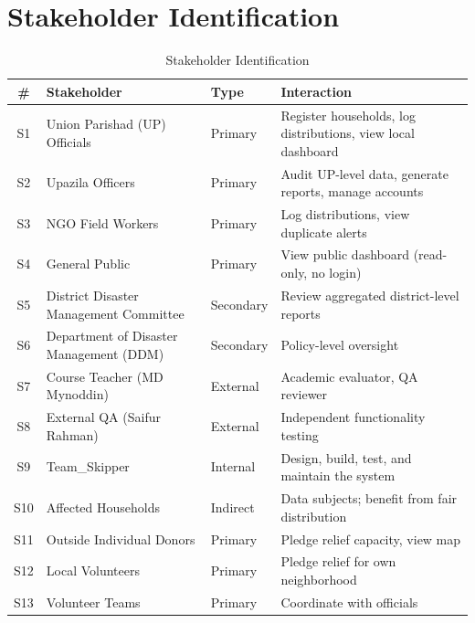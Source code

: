 
\section{Stakeholder Identification}
\vspace{-5pt}
\begin{table}[H]
\centering
\vspace{-8pt}
\caption{Stakeholder Identification}
\vspace{-8pt}
\label{tab:stakeholders}
\begin{tabularx}{\textwidth}{@{}cllX@{}}
\toprule
\# & Stakeholder & Type & Interaction \\
\midrule
S1 & Union Parishad (UP) Officials & Primary & Register households, log distributions, view local dashboard \\
S2 & Upazila Officers & Primary & Audit UP-level data, generate reports, manage accounts \\
S3 & NGO Field Workers & Primary & Log distributions, view duplicate alerts \\
S4 & General Public & Primary & View public dashboard (read-only, no login) \\
S5 & District Disaster Management Committee & Secondary & Review aggregated district-level reports \\
S6 & Department of Disaster Management (DDM) & Secondary & Policy-level oversight \\
S7 & Course Teacher (MD Mynoddin) & External & Academic evaluator, QA reviewer \\
S8 & External QA (Saifur Rahman) & External & Independent functionality testing \\
S9 & Team\_Skipper & Internal & Design, build, test, and maintain the system \\
S10 & Affected Households & Indirect & Data subjects; benefit from fair distribution \\
S11 & Outside Individual Donors & Primary & Pledge relief capacity, view map \\
S12 & Local Volunteers & Primary & Pledge relief for own neighborhood \\
S13 & Volunteer Teams & Primary & Coordinate with officials \\
\bottomrule
\end{tabularx}
\end{table}
\vspace{-20pt}

